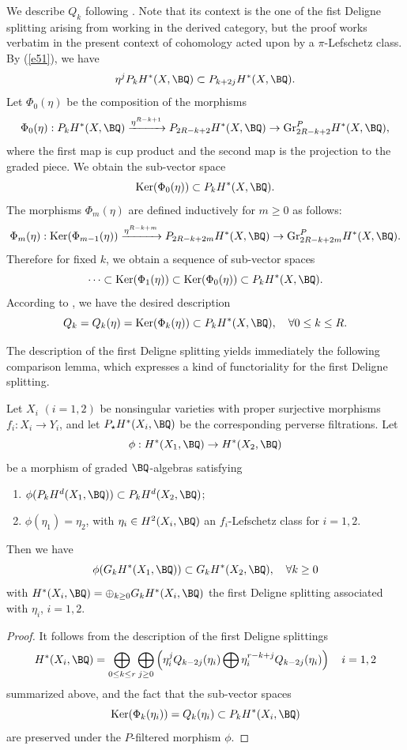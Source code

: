 We describe $Q_k$ following \cite[Section 2.7]{dCM4}. Note that its context is the one of the fist Deligne splitting arising from working in the derived category, but the proof works verbatim in the present context of cohomology acted upon by  a $\pi$-Lefschetz class. By (\ref{e51}), we have
\[
\eta^j P_k H^*(X, \BQ) \subset P_{k+2j}H^*(X, \BQ).
\]
Let $\Phi_0 (\eta)$ be the composition of the morphisms
\[
\Phi_0 (\eta) : P_kH^*(X, \BQ) \xrightarrow{\eta^{{ R}-k+1}} P_{2{ R}-k+2}H^*(X, \BQ) \to \mathrm{Gr}_{2{ R}-k+2}^PH^*(X, \BQ),
\]
where the first map is cup product and the second map is the projection to the graded piece. We obtain the sub-vector space
\[
\mathrm{Ker}(\Phi_0 (\eta)) \subset P_kH^*(X, \BQ).
\]
The morphisms $\Phi_m (\eta)$ are defined inductively for $m\geq 0$ as follows:
\[
\Phi_m (\eta) : \mathrm{Ker}(\Phi_{m-1} (\eta)) \xrightarrow{\eta^{{ R} -k+m}} P_{2{R} -k+2m}H^*(X, \BQ) \to \mathrm{Gr}_{2 { R} -k+2m}^PH^*(X, \BQ).
\]
Therefore for fixed $k$, we obtain a sequence of sub-vector spaces
\[
\cdots \subset \mathrm{Ker}(\Phi_1(\eta)) \subset \mathrm{Ker}(\Phi_0 (\eta) ) \subset P_kH^*(X, \BQ).
\]
According to \cite[Proposition 2.7.1]{dCM4}, we have the desired description
\[
Q_k = Q_k (\eta)= \mathrm{Ker}(\Phi_k (\eta)) \subset P_kH^*(X, \BQ), \quad \forall 0 \leq k \leq { R}.
\]



The description of the first Deligne splitting yields immediately the following comparison lemma, which expresses a kind of functoriality for the first Deligne splitting.

{
\begin{lem}
\notready\label{comparison1}
Let $X_i$ $(i=1,2)$ be nonsingular varieties with proper surjective morphisms $f_i: X_i \to Y_i$, and let $P_\star H^*(X_i, \BQ)$ be the corresponding perverse filtrations.  Let
\[
\phi: H^*(X_1, \BQ) \to H^*(X_2, \BQ)
\]
be a morphism
of graded $\BQ$-algebras satisfying
\begin{enumerate}
    \item[(a)] $\phi(P_kH^d(X_1, \BQ)) \subset P_kH^d(X_2, \BQ)$;
    \item[(b)] $\phi(\eta_1) = \eta_2$,  with {$\eta_i \in H^2(X_i, \BQ)$ an $f_i$-Lefschetz class for $i= 1,2$.}
\end{enumerate}
Then we have
\[
\phi(G_kH^*(X_1, \BQ)) \subset G_k H^*(X_2, \BQ), \quad \forall k \geq 0
\]
with $ H^*(X_i,\BQ)= \oplus_{k\geq 0}G_kH^*(X_i, \BQ)$ the first Deligne splitting associated with $\eta_i$, $i=1,2$.
\end{lem}

\begin{proof}
It follows from the description of the first Deligne splittings
\[H^*(X_i, \BQ) = \bigoplus_{0 \leq k \leq r}
 \bigoplus_{j \geq 0}
 \left(\eta^j_i Q_{k-2j}(\eta_i)  \bigoplus \eta^{r-k+j}_i Q_{k-2j}  (\eta_i)
 \right) \quad i=1,2
\]
summarized above, and the fact that the sub-vector spaces
\[
\mathrm{Ker}(\Phi_k (\eta_i)) = Q_k (\eta_i) \subset P_kH^*(X_i, \BQ)
\]
are preserved under the $P$-filtered morphism $\phi$.
\end{proof}
}


